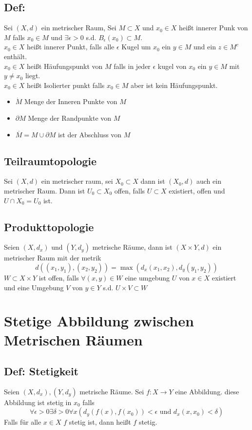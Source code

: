 \subsection{Def: }
Sei $(X,d)$ ein metrischer Raum, Sei $M\subset X$ und $x_0 \in X$ heißt innerer Punk von $M$ falls $x_0 \in M$ und $\exists\epsilon>0$ s.d. $B_\epsilon(x_0) \subset M$.\\
$x_0\in X$ heißt innerer Punkt, falls alle $\epsilon$ Kugel um $x_0$ ein $y\in M$ und ein $z\in M^c$ enthält.\\
$x_0\in X$ heißt Häufungspunkt von $M$ falls in jeder $\epsilon$ kugel von $x_0$ ein $y\in M$ mit $y\neq x_0$ liegt.\\
$x_0\in X$ heißt Isolierter punkt falls $x_0\in M$ aber ist kein Häufungspunkt.
\begin{itemize}
	\item $\dot M$ Menge der Inneren Punkte von $M$
	\item $\partial M$ Menge der Randpunkte von $M$
	\item $\overline M = M \cup \partial M$ ist der Abschluss von $M$ 
\end{itemize}

\subsection{Teilraumtopologie}
Sei $(X,d)$ ein metrischer raum, sei $X_0\subset X$ dann ist $(X_0, d)$ auch ein metrischer Raum. Dann ist $U_0 \subset X_0$ offen, falls $U\subset X$ existiert, offen und $U\cap X_0 = U_0$ ist.
\subsection{Produkttopologie}
Seien $(X,d_x)$ und $(Y,d_y)$ metrische Räume, dann ist $(X\times Y, d)$  ein metrischer Raum mit der metrik
$$
d((x_1,y_1), (x_2,y_2)) = \max(d_x(x_1,x_2), d_y(y_1, y_2))
$$
$W\subset X\times Y$ ist offen, falls $\forall (x,y)\in W$ eine umgebung $U$ von $x\in X$ existiert und eine Umgebung $V$ von $y\in Y$ s.d. $U\times V \subset W$ 

\section{Stetige Abbildung zwischen Metrischen Räumen}
\subsection{Def: Stetigkeit}
Seien $(X, d_x), (Y,d_y)$ metrische Räume. Sei $f:X\rightarrow Y$ eine Abbildung. diese Abbildung ist stetig in $x_0$ falls
$$
\forall \epsilon>0\exists\delta>0 \forall x(d_y(f(x),f(x_0)) < \epsilon \text{ und } d_x(x,x_0)<\delta)
$$
Falls für alle $x\in X$ $f$ stetig ist, dann heißt $f$ stetig.
